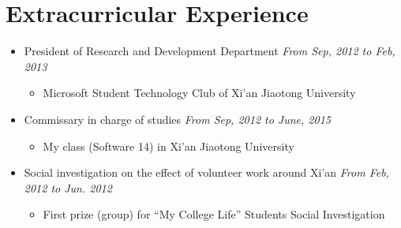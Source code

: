 \documentclass[a4paper,11pt]{article}
\begin{document}
\section{Extracurricular Experience}

\begin{itemize}
    \item President of Research and Development Department \hfill \textit{From Sep, 2012 to Feb, 2013}
    \begin{itemize}
        \item Microsoft Student Technology Club of Xi’an Jiaotong University
    \end{itemize}

    \item Commissary in charge of studies \hfill \textit{From Sep, 2012 to June, 2015}
    \begin{itemize}
        \item My class (Software 14) in Xi’an Jiaotong University
    \end{itemize}

    \item Social investigation on the effect of volunteer work around Xi’an \hfill \textit{From Feb, 2012 to
Jun. 2012}
    \begin{itemize}
        \item First prize (group) for ``My College Life'' Students Social Investigation
    \end{itemize}

\end{itemize}


\setlength{\bibitemsep}{1.8pt}

\begin{publications}
\end{publications}
\end{document}
